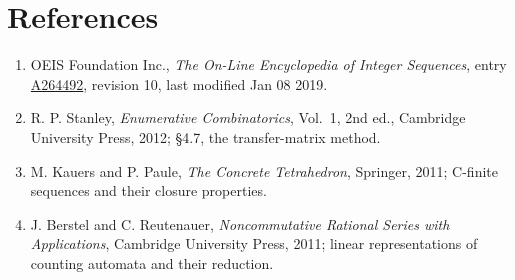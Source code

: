\documentclass[11pt]{article}
\theoremstyle{definition}
\begin{document}
\section{References}

\begin{enumerate}

\item OEIS Foundation Inc., \emph{The On-Line Encyclopedia of Integer Sequences}, entry \href{https://oeis.org/A264492}{A264492}, revision 10, last modified Jan 08 2019.

\item R. P. Stanley, \emph{Enumerative Combinatorics}, Vol.~1, 2nd ed., Cambridge University Press, 2012; \S4.7, the transfer-matrix method.

\item M. Kauers and P. Paule, \emph{The Concrete Tetrahedron}, Springer, 2011; C-finite sequences and their closure properties.

\item J. Berstel and C. Reutenauer, \emph{Noncommutative Rational Series with Applications}, Cambridge University Press, 2011; linear representations of counting automata and their reduction.

\end{enumerate}
\end{document}
